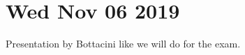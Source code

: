 \documentclass[main.tex]{subfiles}
\begin{document}
\section*{Wed Nov 06 2019}

Presentation by Bottacini like we will do for the exam.
\end{document}
